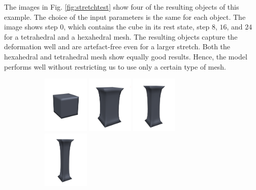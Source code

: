 The images in Fig. \ref{fig:stretchtest} show four of the resulting objects of this example. The choice of the input parameters is the same for each object. The image shows step $0$, which contains the cube in its rest state, step $8$, $16$, and $24$ for a tetrahedral and a hexahedral mesh. The resulting objects capture the deformation well and are artefact-free even for a larger stretch. Both the hexahedral and tetrahedral mesh show equally good results. Hence, the model performs well without restricting us to use only a certain type of mesh.
\begin{figure}[!htbp]
	\centering
	\begin{subfigure}[b]{\textwidth}
        \centering
        \includegraphics[width=0.24\textwidth]{resources/hexcli_00.png}
        \hfill
        \includegraphics[width=0.24\textwidth]{resources/hexcli_08.png}
        \hfill
        \includegraphics[width=0.24\textwidth]{resources/hexcli_16.png}
        \hfill
        \includegraphics[width=0.24\textwidth]{resources/hexcli_24.png}

\end{subfigure}
\end{figure}
